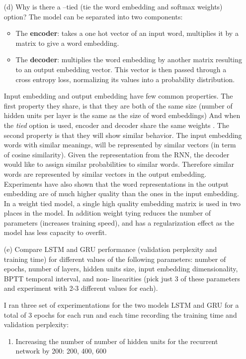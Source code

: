 \documentclass[11pt]{article}
\newcommand{\0}{\mat{0}}
\begin{document}
\begin{itemize}
     \item[(d)] 
    Why is there a --tied (tie the word embedding and softmax weights) option?
    The model can be separated into two components:
    \begin{itemize}
     \item The \textbf{encoder}: takes a one hot vector of an input word, multiplies it by a matrix to give a word embedding. 
     \item The \textbf{decoder}: multiplies the word embedding by another matrix resulting to an output embedding vector. This vector is then passed through a cross entropy loss, normalizing its values into a probability distribution.
    \end{itemize}
    Input embedding and output embedding have few common properties. The first property they share, is that they are both of the same size (number of hidden units per layer is the same as the size of word embeddings) And when the \textit{tied} option is used, encoder and decoder share the same weights . The second property is that they will show similar behavior.
    The input embedding words with similar meanings, will be represented by similar vectors (in term of cosine similarity). Given the representation from the RNN, the decoder would like to assign similar probabilities to similar words.
    Therefore similar words are represented by similar vectors in the output embedding. Experiments have also shown that the word representations in the output embedding are of much higher quality than the ones in the input
    embedding. In a weight tied model, a single high quality embedding matrix is used in two places in the model. In addition weight tying reduces the number of parameters (increases training speed), and has a regularization effect
    as the model has less capacity to overfit.       
    
     \item[(e)] 
     Compare LSTM and GRU performance (validation perplexity and training time) for different values of the following parameters: number of epochs, number of layers, hidden units size, input embedding dimensionality, BPTT temporal interval, and non- linearities (pick just 3 of these parameters and experiment with 2-3 different values for each).
     
     I ran three set of experimentations for the two models LSTM and GRU for a total of 3 epochs for each run and each time recording the training time and validation perplexity:
     \begin{enumerate}
     	\item Increasing the number of number of hidden units for the recurrent network by 200: 200, 400, 600

\end{enumerate}
\end{itemize}
\end{document}
